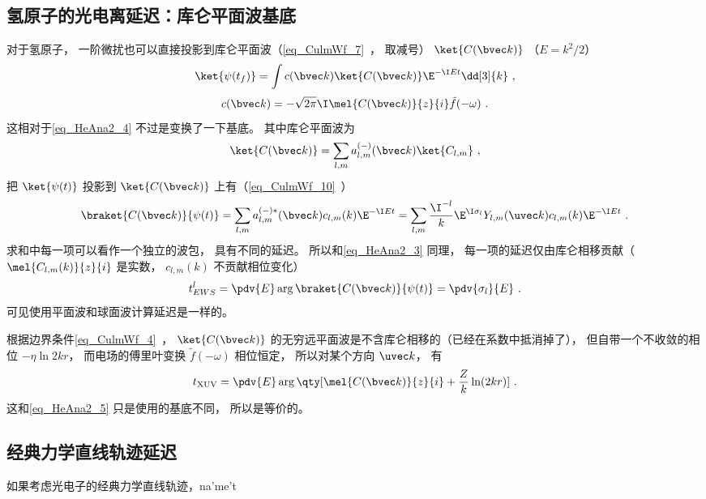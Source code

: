 \subsection{氢原子的光电离延迟：库仑平面波基底} \label{sub_HeAna2_2}
对于氢原子， 一阶微扰也可以直接投影到库仑平面波（\autoref{eq_CulmWf_7}~， 取减号） $\ket{C(\bvec k)}$ （$E = k^2/2$）
\begin{equation}
\ket{\psi(t_f)} = \int c(\bvec k)\ket{C(\bvec k)} \E^{-\I E t} \dd[3]{k}~,
\end{equation}
\begin{equation}
c(\bvec k) = -\sqrt{2\pi}\I\mel{C(\bvec k)}{z}{i} \tilde f(-\omega)~.
\end{equation}
这相对于\autoref{eq_HeAna2_4} 不过是变换了一下基底。 其中库仑平面波为
\begin{equation}
\ket{C(\bvec k)} = \sum_{l,m} a_{l,m}^{(-)}(\bvec k) \ket{C_{l,m}}~,
\end{equation}
把 $\ket{\psi(t)}$ 投影到 $\ket{C(\bvec k)}$ 上有（\autoref{eq_CulmWf_10}~）
\begin{equation}
\braket{C(\bvec k)}{\psi(t)} = \sum_{l,m} a_{l,m}^{(-)*}(\bvec k) c_{l,m}(k) \E^{-\I E t} 
= \sum_{l,m} \frac{\I^{-l}}{k} \E^{\I\sigma_l} Y_{l,m} (\uvec k) c_{l,m}(k) \E^{-\I E t}~.
\end{equation}
求和中每一项可以看作一个独立的波包， 具有不同的延迟。 所以和\autoref{eq_HeAna2_3} 同理， 每一项的延迟仅由库仑相移贡献（$\mel{C_{l,m}(k)}{z}{i}$ 是实数， $c_{l,m}(k)$ 不贡献相位变化）
\begin{equation}\label{eq_HeAna2_6}
t_{EWS}^l = \pdv{E} \arg\braket{C(\bvec k)}{\psi(t)} = \pdv{\sigma_l}{E}~.
\end{equation}
可见使用平面波和球面波计算延迟是一样的。

根据边界条件\autoref{eq_CulmWf_4}~， $\ket{C(\bvec k)}$ 的无穷远平面波是不含库仑相移的（已经在系数中抵消掉了）， 但自带一个不收敛的相位 $-\eta \ln 2kr$， 而电场的傅里叶变换 $\tilde f(-\omega)$ 相位恒定， 所以对某个方向 $\uvec k$， 有
\begin{equation}
t_\text{XUV} = \pdv{E} \arg\qty[\mel{C(\bvec k)}{z}{i} + \frac{Z}{k}\ln(2kr)]~.
\end{equation}
这和\autoref{eq_HeAna2_5} 只是使用的基底不同， 所以是等价的。

\subsection{经典力学直线轨迹延迟}
如果考虑光电子的经典力学直线轨迹，na'me't

